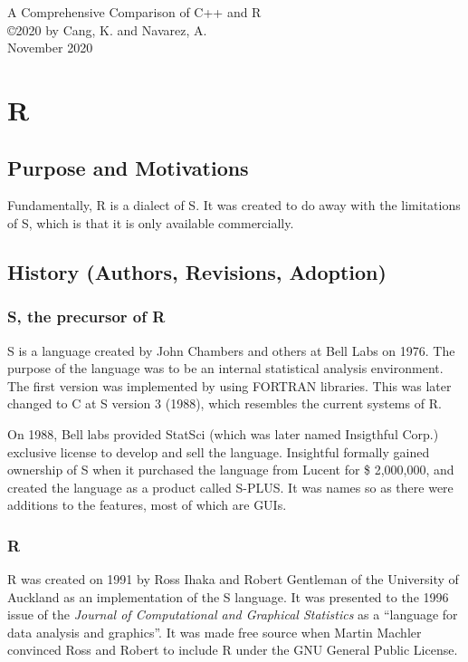 \documentclass[12pt]{article}
\begin{document}
\begin{center}
{\large A Comprehensive Comparison of C++ and R} \\ %
\copyright 2020 by Cang, K. and Navarez, A. \\
November 2020
\end{center}

\tableofcontents
\newpage

\section{R}
\subsection{Purpose and Motivations}
Fundamentally, R is a dialect of S. It was created to do away with the limitations of S, which is that it is only available commercially.
\subsection{History (Authors, Revisions, Adoption)}
\subsubsection{S, the precursor of R}
S is a language created by John Chambers and others at Bell Labs on 1976. The purpose of the language was to be an internal statistical analysis environment. The first version was implemented by using FORTRAN libraries. This was later changed to C at S version 3 (1988), which resembles the current systems of R.

On 1988, Bell labs provided StatSci (which was later named Insigthful Corp.) exclusive license to develop and sell the language. Insightful formally gained ownership of S when it purchased the language from Lucent for \$ 2,000,000, and created the language as a product called S-PLUS. It was names so as there were additions to the features, most of which are GUIs.

\subsubsection{R}
R was created on 1991 by Ross Ihaka and Robert Gentleman of the University of Auckland as an implementation of the S language. It was presented to the 1996 issue of the \textit{Journal of Computational and Graphical Statistics} as a ``language for data analysis and graphics''. It was made free source when Martin Machler convinced Ross and Robert to include R under the GNU General Public License.
\end{document}
